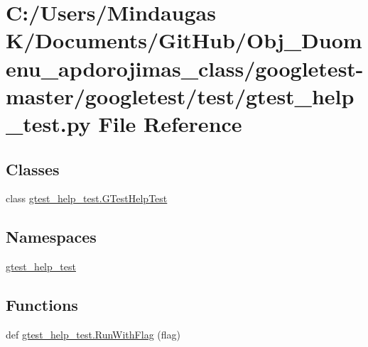 \hypertarget{googletest-master_2googletest_2test_2gtest__help__test_8py}{}\section{C\+:/\+Users/\+Mindaugas K/\+Documents/\+Git\+Hub/\+Obj\+\_\+\+Duomenu\+\_\+apdorojimas\+\_\+class/googletest-\/master/googletest/test/gtest\+\_\+help\+\_\+test.py File Reference}
\label{googletest-master_2googletest_2test_2gtest__help__test_8py}
\subsection*{Classes}
\begin{DoxyCompactItemize}
\item 
class \mbox{\hyperlink{classgtest__help__test_1_1_g_test_help_test}{gtest\+\_\+help\+\_\+test.\+G\+Test\+Help\+Test}}
\end{DoxyCompactItemize}
\subsection*{Namespaces}
\begin{DoxyCompactItemize}
\item 
 \mbox{\hyperlink{namespacegtest__help__test}{gtest\+\_\+help\+\_\+test}}
\end{DoxyCompactItemize}
\subsection*{Functions}
\begin{DoxyCompactItemize}
\item 
def \mbox{\hyperlink{namespacegtest__help__test_a3d369750dac11a6dca523139fe1e6c86}{gtest\+\_\+help\+\_\+test.\+Run\+With\+Flag}} (flag)
\end{DoxyCompactItemize}
